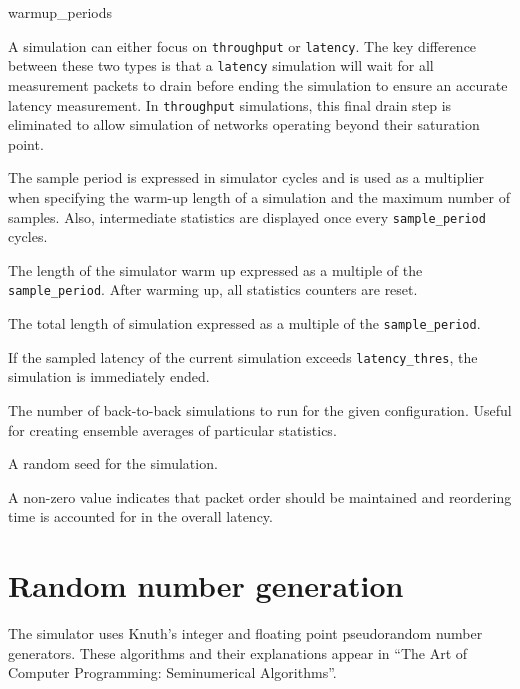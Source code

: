 \documentclass[11pt]{article}
\begin{document}
\begin{opt_list}{warmup\_periods}

\item[sim\_type] A simulation can either focus on
\texttt{throughput} or \texttt{latency}.  The key difference between
these two types is that a \texttt{latency} simulation will wait for
all measurement packets to drain before ending the simulation to
ensure an accurate latency measurement.  In \texttt{throughput}
simulations, this final drain step is eliminated to allow simulation
of networks operating beyond their saturation point.

\item[sample\_period] The sample period is expressed in simulator
cycles and is used as a multiplier when specifying the warm-up length
of a simulation and the maximum number of samples.  Also, intermediate
statistics are displayed once every \texttt{sample\_period} cycles.

\item[warmup\_periods] The length of the simulator warm up expressed
as a multiple of the \texttt{sample\_period}.  After warming up, all
statistics counters are reset.

\item[max\_samples] The total length of simulation expressed as a
multiple of the \texttt{sample\_period}.

\item[latency\_thres] If the sampled latency of the current simulation
exceeds \texttt{latency\_thres}, the simulation is immediately ended.

\item[sim\_count] The number of back-to-back simulations to run for the
given configuration.  Useful for creating ensemble averages of
particular statistics.

\item[seed] A random seed for the simulation.

\item[reorder] A non-zero value indicates that packet order should be
maintained and reordering time is accounted for in the overall latency.

\end{opt_list}

\appendix

\section{Random number generation}

The simulator uses Knuth's integer and floating point pseudorandom
number generators.  These algorithms and their explanations appear in
``The Art of Computer Programming: Seminumerical Algorithms''.
\end{document}
